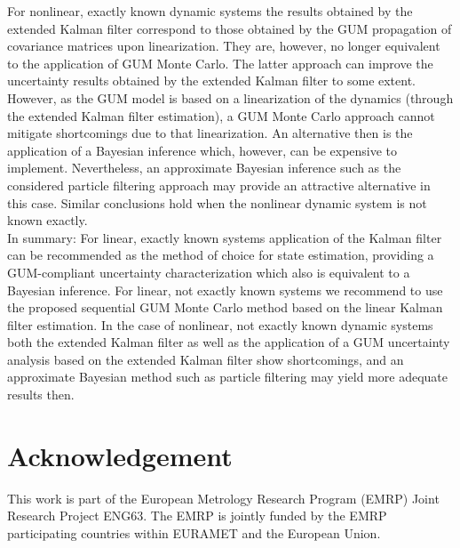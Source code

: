 \documentclass[10pt]{article}
\begin{document}
\begin{spacing}{1}
For nonlinear, exactly known dynamic systems the results obtained by the extended Kalman filter correspond to those obtained by the GUM propagation of covariance matrices upon linearization. They are, however, no longer equivalent to the application of GUM Monte Carlo. The latter approach can improve the uncertainty results obtained by the extended Kalman filter to some extent. However, as the GUM model is based on a linearization of the dynamics (through the extended Kalman filter estimation), a GUM Monte Carlo approach cannot mitigate shortcomings due to that linearization. An alternative then is the application of a Bayesian inference which, however, can be expensive to implement. Nevertheless, an approximate Bayesian inference such as the considered particle filtering approach may provide an attractive alternative in this case. Similar conclusions hold when the nonlinear dynamic system is not known exactly.\\

In summary: For linear, exactly known systems application of the Kalman filter can be recommended as the method of choice for state estimation, providing a GUM-compliant uncertainty characterization which also is equivalent to a Bayesian inference. For linear, not exactly known systems we recommend to use the proposed sequential GUM Monte Carlo method based on the linear Kalman filter estimation. In the case of nonlinear, not exactly known dynamic systems both the extended Kalman filter as well as the application of a GUM uncertainty analysis based on the extended Kalman filter show shortcomings, and an approximate Bayesian method such as particle filtering may yield more adequate results then.

\section*{Acknowledgement}
This work is part of the European Metrology Research Program (EMRP) Joint Research Project ENG63. The EMRP is jointly funded by the EMRP participating countries within EURAMET and the European Union.




\end{spacing}
\end{document}

